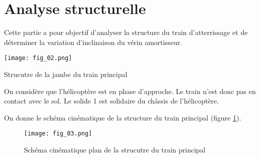 \section{Analyse structurelle}
\begin{obj}
Cette partie a pour objectif d'analyser la structure du train d'atterrissage et de déterminer la variation d'inclinaison du vérin amortisseur.
\end{obj}



\begin{marginfigure}
\texttt{[image: fig\_02.png]}
\caption{Strucutre de la jambe du train principal \label{fig_sia2014_02}}
\end{marginfigure}

On considère que l'hélicoptère est en phase d'approche. Le train n'est donc pas en contact avec le sol. Le solide 1 est solidaire du châssis de l'hélicoptère. 





On donne le schéma cinématique de la structure du train principal (figure \ref{fig_sia2014_03}).
\begin{figure}[H]
\texttt{[image: fig\_03.png]}
\caption{Schéma cinématique plan de la strucutre du train principal \label{fig_sia2014_03}}
\end{figure}


